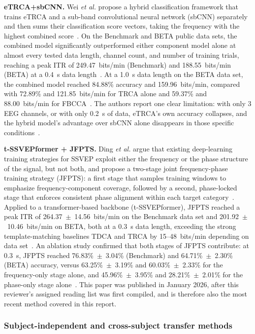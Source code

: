 \documentclass[11pt]{article}
\begin{document}
\textbf{eTRCA+sbCNN.} Wei \textit{et al.} propose a hybrid classification framework that trains eTRCA and a sub-band convolutional neural network (sbCNN) separately and then sums their classification score vectors, taking the frequency with the highest combined score~\cite{wei2025etrcasbcnn}. On the Benchmark and BETA public data sets, the combined model significantly outperformed either component model alone at almost every tested data length, channel count, and number of training trials, reaching a peak ITR of 249.47~bits/min (Benchmark) and 188.55~bits/min (BETA) at a 0.4~s data length~\cite{wei2025etrcasbcnn}. At a 1.0~s data length on the BETA data set, the combined model reached 84.88\% accuracy and 159.96~bits/min, compared with 72.89\% and 121.85~bits/min for TRCA alone and 59.37\% and 88.00~bits/min for FBCCA~\cite{wei2025etrcasbcnn}. The authors report one clear limitation: with only 3 EEG channels, or with only 0.2~s of data, eTRCA's own accuracy collapses, and the hybrid model's advantage over sbCNN alone disappears in those specific conditions~\cite{wei2025etrcasbcnn}.

\textbf{t-SSVEPformer + JFPTS.} Ding \textit{et al.} argue that existing deep-learning training strategies for SSVEP exploit either the frequency or the phase structure of the signal, but not both, and propose a two-stage joint frequency-phase training strategy (JFPTS): a first stage that samples training windows to emphasize frequency-component coverage, followed by a second, phase-locked stage that enforces consistent phase alignment within each target category~\cite{ding2026jfpts}. Applied to a transformer-based backbone (t-SSVEPformer), JFPTS reached a peak ITR of 264.37~$\pm$~14.56~bits/min on the Benchmark data set and 201.92~$\pm$~10.46~bits/min on BETA, both at a 0.3~s data length, exceeding the strong template-matching baselines TDCA and TRCA by 15--48~bits/min depending on data set~\cite{ding2026jfpts}. An ablation study confirmed that both stages of JFPTS contribute: at 0.3~s, JFPTS reached 76.83\%~$\pm$~3.04\% (Benchmark) and 64.71\%~$\pm$~2.30\% (BETA) accuracy, versus 63.25\%~$\pm$~3.19\% and 60.03\%~$\pm$~2.33\% for the frequency-only stage alone, and 45.96\%~$\pm$~3.95\% and 28.21\%~$\pm$~2.01\% for the phase-only stage alone~\cite{ding2026jfpts}. This paper was published in January 2026, after this reviewer's assigned reading list was first compiled, and is therefore also the most recent method covered in this report.

\subsubsection{Subject-independent and cross-subject transfer methods}
\end{document}
